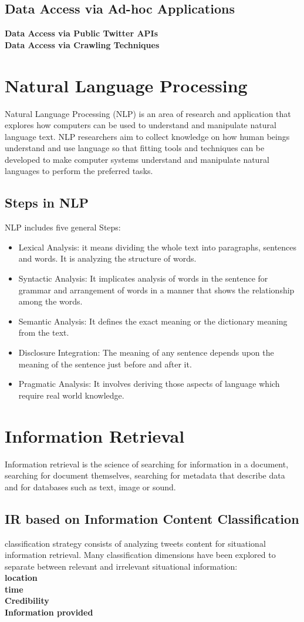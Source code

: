 \subsection{Data Access via Ad-hoc Applications}
\textbf{Data Access via Public Twitter APIs}\\
\textbf{Data Access via Crawling Techniques}
\section{Natural Language Processing}
Natural Language Processing (NLP) is an area of research and application that explores how computers can be used to understand and manipulate natural language text. NLP researchers aim to collect knowledge on how human beings understand and use language so that fitting tools and techniques can be developed to make computer systems understand and manipulate natural languages to perform the preferred tasks.
\subsection{Steps in NLP}
NLP includes five general Steps:
\begin{itemize}
\item Lexical Analysis: it means dividing the whole text into paragraphs, sentences and words. It is analyzing the structure of words. 
\item Syntactic Analysis: It implicates analysis of words in the sentence for grammar and arrangement of words in a manner that shows the relationship among the words.
\item Semantic Analysis:  It defines the exact meaning or the dictionary meaning from the text.
\item Disclosure Integration: The meaning of any sentence depends upon the meaning of the sentence just before and after it.
\item Pragmatic Analysis: It involves deriving those aspects of language which require real world knowledge.
\end{itemize}
\section{Information Retrieval}
Information retrieval is the science of searching for information in a document, searching for document themselves, searching for metadata that describe data and for databases such as text, image or sound.
\subsection{IR based on Information Content Classification}
classification strategy consists of analyzing tweets content for
situational information retrieval. Many classification dimensions have been explored to separate between relevant and irrelevant situational information:
\\
\textbf{location}\\
\textbf{time}\\
\textbf{Credibility}\\
\textbf{Information provided}
